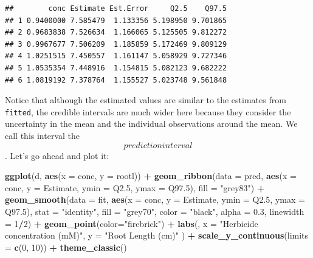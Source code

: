\documentclass[
]{book}
\newenvironment{Shaded}{\begin{snugshade}}{\end{snugshade}}
\newcommand{\AttributeTok}[1]{\textcolor[rgb]{0.13,0.29,0.53}{#1}}
\newcommand{\DecValTok}[1]{\textcolor[rgb]{0.00,0.00,0.81}{#1}}
\newcommand{\FloatTok}[1]{\textcolor[rgb]{0.00,0.00,0.81}{#1}}
\newcommand{\FunctionTok}[1]{\textcolor[rgb]{0.13,0.29,0.53}{\textbf{#1}}}
\newcommand{\NormalTok}[1]{#1}
\newcommand{\SpecialCharTok}[1]{\textcolor[rgb]{0.81,0.36,0.00}{\textbf{#1}}}
\newcommand{\StringTok}[1]{\textcolor[rgb]{0.31,0.60,0.02}{#1}}
\begin{document}
\begin{verbatim}
##        conc Estimate Est.Error     Q2.5    Q97.5
## 1 0.9400000 7.585479  1.133356 5.198950 9.701865
## 2 0.9683838 7.526634  1.166065 5.125505 9.812272
## 3 0.9967677 7.506209  1.185859 5.172469 9.809129
## 4 1.0251515 7.450557  1.161147 5.058929 9.727346
## 5 1.0535354 7.448916  1.154815 5.082123 9.682222
## 6 1.0819192 7.378764  1.155527 5.023748 9.561848
\end{verbatim}

Notice that although the estimated values are similar to the estimates from \texttt{fitted}, the credible intervals are much wider here because they consider the uncertainty in the mean and the individual observations around the mean. We call this interval the \[prediction interval\]. Let's go ahead and plot it:

\begin{Shaded}
\begin{Highlighting}[]
\FunctionTok{ggplot}\NormalTok{(d, }\FunctionTok{aes}\NormalTok{(}\AttributeTok{x =}\NormalTok{ conc, }\AttributeTok{y =}\NormalTok{ rootl)) }\SpecialCharTok{+}
  \FunctionTok{geom\_ribbon}\NormalTok{(}\AttributeTok{data =}\NormalTok{ pred, }
              \FunctionTok{aes}\NormalTok{(}\AttributeTok{x =}\NormalTok{ conc, }\AttributeTok{y =}\NormalTok{ Estimate, }\AttributeTok{ymin =}\NormalTok{ Q2}\FloatTok{.5}\NormalTok{, }\AttributeTok{ymax =}\NormalTok{ Q97}\FloatTok{.5}\NormalTok{),}
              \AttributeTok{fill =} \StringTok{"grey83"}\NormalTok{) }\SpecialCharTok{+}
  \FunctionTok{geom\_smooth}\NormalTok{(}\AttributeTok{data =}\NormalTok{ fit,}
              \FunctionTok{aes}\NormalTok{(}\AttributeTok{x =}\NormalTok{ conc, }\AttributeTok{y =}\NormalTok{ Estimate, }\AttributeTok{ymin =}\NormalTok{ Q2}\FloatTok{.5}\NormalTok{, }\AttributeTok{ymax =}\NormalTok{ Q97}\FloatTok{.5}\NormalTok{),}
              \AttributeTok{stat =} \StringTok{"identity"}\NormalTok{,}
              \AttributeTok{fill =} \StringTok{"grey70"}\NormalTok{, }\AttributeTok{color =} \StringTok{"black"}\NormalTok{, }\AttributeTok{alpha =} \FloatTok{0.3}\NormalTok{, }\AttributeTok{linewidth =} \DecValTok{1}\SpecialCharTok{/}\DecValTok{2}\NormalTok{) }\SpecialCharTok{+}
  \FunctionTok{geom\_point}\NormalTok{(}\AttributeTok{color=}\StringTok{"firebrick"}\NormalTok{) }\SpecialCharTok{+}
  \FunctionTok{labs}\NormalTok{(,}
    \AttributeTok{x =} \StringTok{"Herbicide concentration (mM)"}\NormalTok{,}
    \AttributeTok{y =} \StringTok{"Root Length (cm)"}
\NormalTok{  ) }\SpecialCharTok{+}
  \FunctionTok{scale\_y\_continuous}\NormalTok{(}\AttributeTok{limits =} \FunctionTok{c}\NormalTok{(}\DecValTok{0}\NormalTok{, }\DecValTok{10}\NormalTok{)) }\SpecialCharTok{+} 
  \FunctionTok{theme\_classic}\NormalTok{()}
\end{Highlighting}
\end{Shaded}
\end{document}
